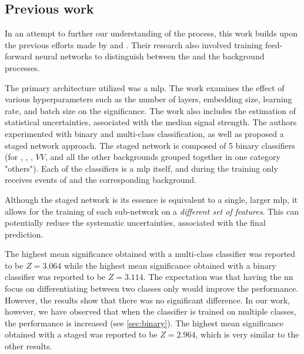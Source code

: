 \subsection{Previous work}

In an attempt to further our understanding of the \tth process, this work builds upon the previous efforts made by
\severin and \jan. Their research also involved training feed-forward neural networks to distinguish between the \tth
and the background processes.

The primary architecture \cite{severin} utilized was a \gls{mlp}. The work examines the effect of various
hyperparameters such as the number of layers, embedding size, learning rate, and batch size on the significance. The
work also includes the estimation of statistical uncertainties, associated with the median signal strength. The authors
experimented with binary and multi-class classification, as well as proposed a staged network approach. The staged
network is composed of 5 binary classifiers (for \ttz, \ttw, \ttbar, $VV$, and all the other backgrounds grouped
together in one category "others"). Each of the classifiers is a \gls{mlp} itself, and during the training only receives
events of \tth and the corresponding background.


Although the staged network is its essence is equivalent to a single, larger \gls{mlp}, it allows for the training of
each sub-network on a \emph{different set of features}. This can potentially reduce the systematic uncertainties,
associated with the final prediction. 

The highest mean significance obtained with a multi-class classifier was reported to be $Z = 3.064$ while the highest
mean significance obtained with a binary classifier was reported to be $Z = 3.114$. The expectation was that having the
\gls{nn} focus on differentiating between two classes only would improve the performance. However, the results show that
there was no significant difference. In our work, however, we have observed that when the classifier is trained on
multiple classes, the performance is increased (see \autoref{sec:binary}). The highest mean significance obtained with a
staged was reported to be $Z = 2.964$, which is very similar to the other results.





